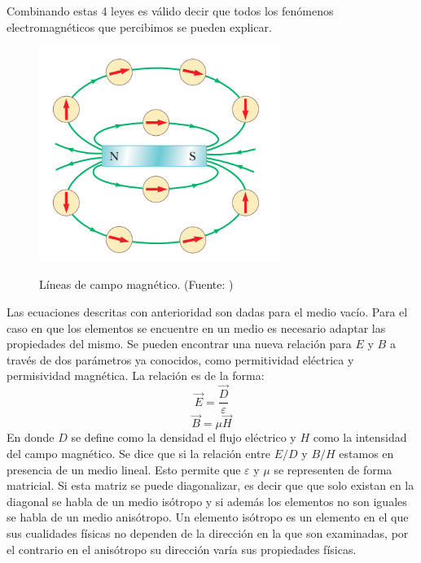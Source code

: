 Combinando estas 4 leyes es válido decir que todos los fenómenos electromagnéticos que percibimos se pueden explicar. 
\begin{figure}[H]
\centering
\includegraphics[height=7cm]{Imagenes/lineasmag.png}\label{fig:Lineas de campo magnetico}
\caption{Líneas de campo magnético. (Fuente: \cite{serway2015fisica})}
\end{figure}
Las ecuaciones descritas con anterioridad son dadas para el medio vacío. Para el caso en que los elementos se encuentre en un medio es necesario adaptar las propiedades del mismo. Se pueden encontrar una nueva relación para $E$ y $B$ a través de dos parámetros ya conocidos, como permitividad eléctrica y permisividad magnética. La relación es de la forma:
$$\vec{E}=\frac{\vec{D}}{\varepsilon}$$
$$\vec{B}=\mu \vec{H}$$
En donde $D$ se define como la densidad el flujo eléctrico y $H$ como la intensidad del campo magnético. Se dice que si la relación entre  $E/D$ y $B/H$ estamos en presencia de un medio lineal. Esto permite que $\varepsilon$ y $\mu$ se representen de forma matricial. Si esta matriz se puede diagonalizar, es decir que que solo existan en la diagonal se habla de un medio isótropo y si además los elementos no son iguales se habla de un medio anisótropo. Un elemento isótropo es un elemento en el que sus cualidades físicas no dependen de la dirección en la que son examinadas, por el contrario en el anisótropo su dirección varía sus propiedades físicas.

